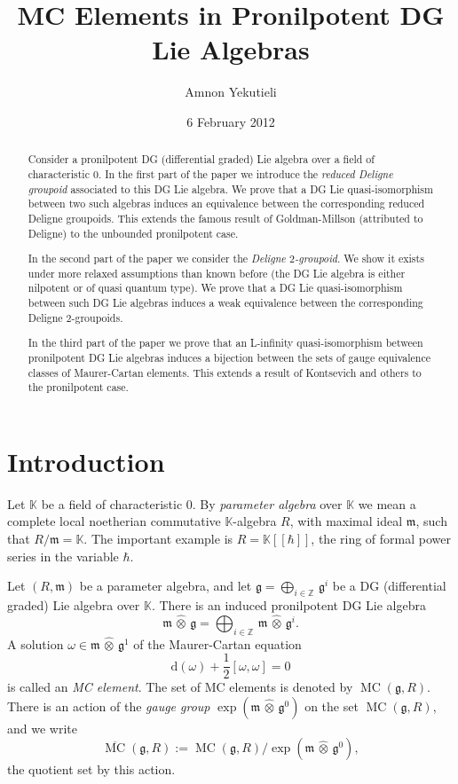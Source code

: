 \documentclass[a4paper,10pt]{amsart}
\date{6 February 2012}
\title[MC Elements]{MC Elements in Pronilpotent DG Lie Algebras}
\author{Amnon Yekutieli}
\theoremstyle{definition}
\numberwithin{equation}{section}
\newcommand{\opn}{\operatorname}
\newcommand{\ol}{\overline}
\newcommand{\mfrak}[1]{\mathfrak{#1}}
\newcommand{\mrm}[1]{\mathrm{#1}}
\newcommand{\mbb}[1]{\mathbb{#1}}
\newcommand{\smfrac}[2]{\textstyle \frac{#1}{#2}}
\newcommand{\what}[1]{\widehat{#1}}
\newcommand{\hatotimes}{\, \what{\otimes} \,}
\newcommand{\hot}{\hatotimes}
\newcommand{\K}{\mbb{K}}
\newcommand{\Z}{\mbb{Z}}
\newcommand{\g}{\mfrak{g}}
\newcommand{\m}{\mfrak{m}}
\renewcommand{\d}{\mrm{d}}
\newcommand{\om}{\omega}
\begin{document}
\begin{abstract}
Consider a pronilpotent DG (differential graded) Lie algebra over a field of
characteristic $0$. 
In the first part of the paper we introduce the {\em reduced Deligne groupoid}
associated to this DG Lie algebra. We prove that a DG Lie  
quasi-iso\-morphism between two such algebras induces an equivalence between the
corresponding reduced Deligne groupoids. This extends the famous result of
Goldman-Millson (attributed to Deligne) to the unbounded pronilpotent case.

In the second part of the paper we consider the {\em Deligne $2$-groupoid}. 
We show it exists under more relaxed assumptions than known before (the DG Lie
algebra is either nilpotent or of quasi quantum type). We prove that a DG Lie 
quasi-isomorphism between such DG Lie algebras induces a weak equivalence
between the corresponding Deligne $2$-groupoids. 

In the third part of the paper we prove that an L-infinity quasi-isomorphism
between pronilpotent DG Lie algebras induces a bijection between the sets of
gauge equivalence classes of Maurer-Cartan elements. This extends a result of
Kontsevich and others to the pronilpotent case.
\end{abstract}

\maketitle


\tableofcontents

\setcounter{section}{-1}
\section{Introduction}
\label{sec:Int}

Let $\K$ be a field of characteristic $0$.
By {\em parameter algebra} over $\K$ we mean a complete
local noetherian commutative $\K$-algebra $R$, with maximal ideal $\m$, such
that $R / \m = \K$. The important example is $R = \K[[\hbar]]$, the ring of 
formal power series in the variable $\hbar$.

Let $(R, \m)$ be a parameter algebra, and let 
$\g = \bigoplus_{i \in \Z}\, \g^i$ be a DG
(differential graded) Lie algebra over $\K$.
There is an induced pronilpotent DG Lie algebra 
\[ \m \hot \g = \bigoplus_{i \in \Z}\, \m \hot \g^i . \]
A solution $\om \in \m \hot \g^1$ of the Maurer-Cartan equation 
\[ \d(\om) + \smfrac{1}{2} [\om, \om] = 0 \]
is called an {\em MC element}. The set of MC elements is denoted by 
$\opn{MC}(\g, R)$. There is an action of the {\em gauge group} 
$\opn{exp}(\m \hot \g^0)$
on the set $\opn{MC}(\g, R)$, and we write
\begin{equation}
\ol{\opn{MC}}(\g, R) := \opn{MC}(\g, R) / \opn{exp}(\m \hot \g^0) ,
\end{equation}
the quotient set by this action.
\end{document}
